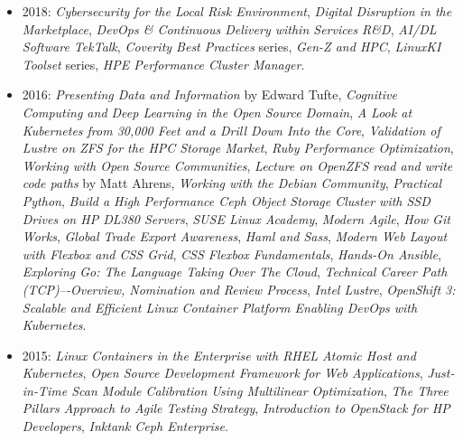 \documentclass[10pt,letterpaper,oneside]{report}
\begin{document}
\begin{itemize}
  \item 2018:
    \textit{Cybersecurity for the Local Risk Environment},
    \textit{Digital Disruption in the Marketplace},
    \textit{DevOps \& Continuous Delivery within Services R\&D},
    \textit{AI/DL Software TekTalk},
    \textit{Coverity Best Practices} series,
    \textit{Gen-Z and HPC},
    \textit{LinuxKI Toolset} series,
    \textit{HPE Performance Cluster Manager}.

  \item 2016:
    \textit{Presenting Data and Information} by Edward Tufte,
    \textit{Cognitive Computing and Deep Learning in the Open Source Domain},
    \textit{A Look at Kubernetes from 30,000 Feet and a Drill Down Into the Core},
    \textit{Validation of Lustre on ZFS for the HPC Storage Market},
    \textit{Ruby Performance Optimization},
    \textit{Working with Open Source Communities},
    \textit{Lecture on OpenZFS read and write code paths} by Matt Ahrens,
    \textit{Working with the Debian Community},
    \textit{Practical Python},
    \textit{Build a High Performance Ceph Object Storage Cluster with SSD Drives
      on HP DL380 Servers},
    \textit{SUSE Linux Academy},
    \textit{Modern Agile},
    \textit{How Git Works},
    \textit{Global Trade Export Awareness},
    \textit{Haml and Sass},
    \textit{Modern Web Layout with Flexbox and CSS Grid},
    \textit{CSS Flexbox Fundamentals},
    \textit{Hands-On Ansible},
    \textit{Exploring Go: The Language Taking Over The Cloud},
    \textit{Technical Career Path (TCP)–-Overview, Nomination and Review Process},
    \textit{Intel Lustre},
    \textit{OpenShift 3: Scalable and Efficient Linux Container Platform
      Enabling DevOps with Kubernetes}.

  \item 2015:
    \textit{Linux Containers in the Enterprise with RHEL Atomic Host and Kubernetes},
    \textit{Open Source Development Framework for Web Applications},
    \textit{Just-in-Time Scan Module Calibration Using Multilinear Optimization},
    \textit{The Three Pillars Approach to Agile Testing Strategy},
    \textit{Introduction to OpenStack for HP Developers},
    \textit{Inktank Ceph Enterprise}.


\end{itemize}
\end{document}
